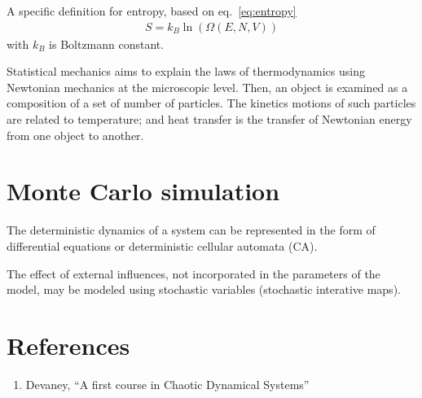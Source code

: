 A specific definition for entropy, based on eq.~\eqref{eq:entropy}
\begin{eqnarray}
  \label{eq:420}
  S = k_B \ln(\Omega(E,N,V))
\end{eqnarray}
with $k_B$ is Boltzmann constant.


Statistical mechanics aims to explain the laws of thermodynamics using
Newtonian mechanics at the microscopic level.
Then, an object is examined as a composition of a set of number of
particles. The kinetics motions of such particles are related to
temperature; and heat transfer is the transfer of Newtonian energy
from one object to another.


\section{Monte Carlo simulation}
\label{sec:monte-carlo-simul}

The deterministic dynamics of a system can be represented in the form
of differential equations or deterministic cellular automata (CA). 

The effect of external influences, not incorporated in the parameters
of the model, may be modeled using stochastic variables (stochastic
interative maps).


\section{References}
\label{sec:references}


\begin{enumerate}
\item Devaney, ``A first course in Chaotic Dynamical Systems''
\end{enumerate}
